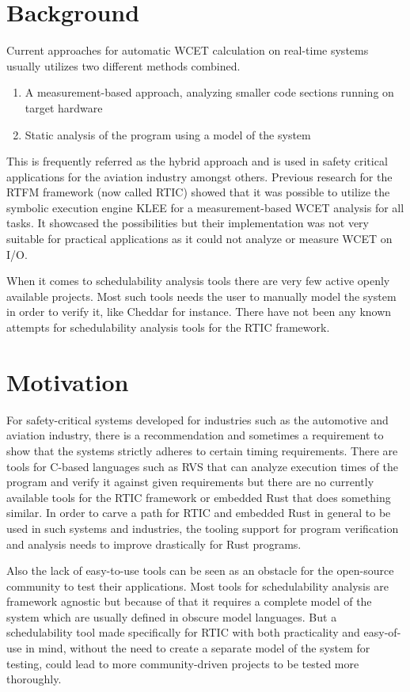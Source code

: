 \section{Background}
Current approaches for automatic WCET calculation on real-time systems usually
utilizes two different methods combined.
\begin{enumerate}
    \item A measurement-based approach, analyzing smaller code sections running
        on target hardware
    \item Static analysis of the program using a model of the system
\end{enumerate}
This is frequently referred as the hybrid approach and is used in safety
critical applications for the aviation industry\cite{rapita} amongst others.
Previous research for the RTFM framework (now called RTIC) showed that it was
possible to utilize the symbolic execution engine KLEE for a measurement-based
WCET analysis for all tasks\cite{lindner}. It showcased the possibilities but
their implementation was not very suitable for practical applications as it
could not analyze or measure WCET on I/O.

When it comes to schedulability analysis tools there are very few active openly
available projects. Most such tools needs the user to manually model the system
in order to verify it, like Cheddar\cite{cheddar} for instance. There have not
been any known attempts for schedulability analysis tools for the RTIC
framework.

\section{Motivation}
For safety-critical systems developed for industries such as the automotive and
aviation industry, there is a recommendation and sometimes a requirement to
show that the systems strictly adheres to certain timing requirements. There
are tools for C-based languages such as RVS\cite{rapita} that can analyze
execution times of the program and verify it against given requirements but
there are no currently available tools for the RTIC framework or embedded Rust
that does something similar. In order to carve a path for RTIC and embedded
Rust in general to be used in such systems and industries, the tooling support
for program verification and analysis needs to improve drastically for Rust
programs. 

Also the lack of easy-to-use tools can be seen as an obstacle for the
open-source community to test their applications. Most tools for schedulability
analysis are framework agnostic but because of that it requires a complete
model of the system which are usually defined in obscure model languages. But a
schedulability tool made specifically for RTIC with both practicality and
easy-of-use in mind, without the need to create a separate model of the system
for testing, could lead to more community-driven projects to be tested more
thoroughly.

